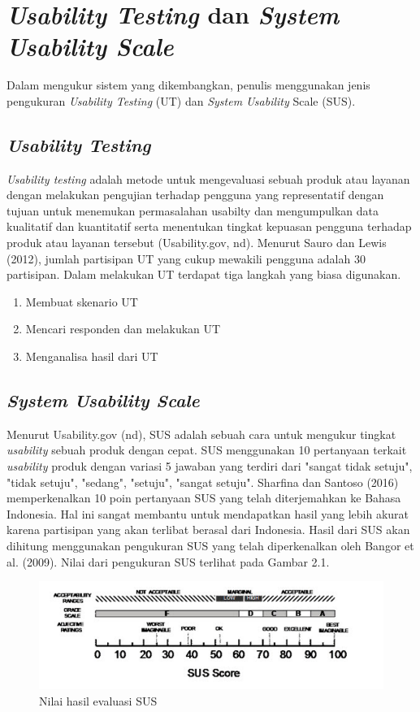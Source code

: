 \section{\textit{Usability Testing} dan \textit{System Usability Scale}}

Dalam mengukur sistem yang dikembangkan, penulis menggunakan jenis pengukuran \textit{Usability Testing} (UT) dan \textit{System Usability} Scale (SUS).
	\subsection{\textit{Usability Testing}}
	\textit{Usability testing} adalah metode untuk mengevaluasi sebuah produk atau layanan dengan melakukan pengujian terhadap pengguna yang representatif dengan tujuan untuk menemukan permasalahan usabilty dan mengumpulkan data kualitatif dan kuantitatif serta menentukan tingkat kepuasan pengguna terhadap produk atau layanan tersebut (Usability.gov, nd).
	\linebreak\linebreak
	Menurut Sauro dan Lewis (2012), jumlah partisipan UT yang cukup mewakili pengguna adalah 30 partisipan. Dalam melakukan UT terdapat tiga langkah yang biasa digunakan.
	\begin{enumerate}
		\item Membuat skenario UT
		\item Mencari responden dan melakukan UT
		\item Menganalisa hasil dari UT
	\end{enumerate}
	 
	\subsection{\textit{System Usability Scale}}
	Menurut Usability.gov (nd), SUS adalah sebuah cara untuk mengukur tingkat \textit{usability} sebuah produk dengan cepat. SUS menggunakan 10 pertanyaan terkait \textit{usability} produk dengan variasi 5 jawaban yang terdiri dari "sangat tidak setuju", "tidak setuju", "sedang", "setuju", "sangat setuju". Sharfina dan Santoso (2016) memperkenalkan 10 poin pertanyaan SUS yang telah diterjemahkan ke Bahasa Indonesia. Hal ini sangat membantu untuk mendapatkan hasil yang lebih akurat karena partisipan yang akan terlibat berasal dari Indonesia.
	\linebreak\linebreak
	Hasil dari SUS akan dihitung menggunakan pengukuran SUS yang telah diperkenalkan oleh Bangor et al. (2009). Nilai dari pengukuran SUS terlihat pada Gambar 2.1.
	\begin{figure}
		\includegraphics{pics/susscore}
		\caption{Nilai hasil evaluasi SUS \citep{paper.bangor}}
		\centering
	\end{figure}